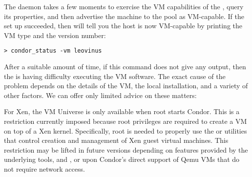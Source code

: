 The  daemon takes a few moments to exercise the VM
capabilities of the , query its properties, and then 
advertise the machine to the pool as VM-capable.  If the set up 
succeeded, then  will tell you the host is now 
VM-capable by printing the VM type and the version number:

\begin{verbatim}
> condor_status -vm leovinus
\end{verbatim}

After a suitable amount of time, if this command does not give any output,
then the  is having difficulty executing the VM software.
The exact cause of the problem depends on the details of the VM, the local 
installation, and a variety of other factors. We can offer only limited 
advice on these matters:

For Xen, the VM Universe is only available when root starts Condor.
This is a restriction currently imposed because root privileges are 
required to create a VM on top of a Xen kernel. Specifically, root is needed 
to properly use the  or  utilities that control 
creation and management of Xen guest virtual machines. This restriction 
may be lifted in future versions depending on features provided by the 
underlying tools,  and , or upon Condor's direct 
support of Qemu VMs that do not require network access.
